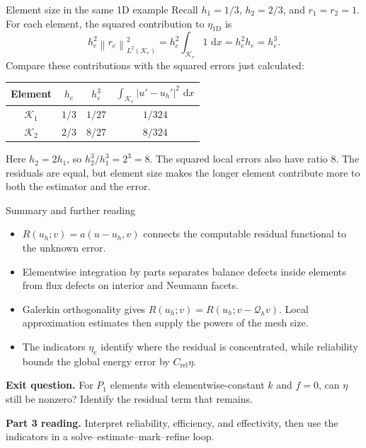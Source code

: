 \documentclass[11pt,aspectratio=169]{beamer}
\newcommand{\dd}{\,\mathrm{d}}
\newcommand{\Qh}{\mathcal Q_h}
\newcommand{\norm}[2][]{\left\lVert#2\right\rVert_{#1}}
\begin{document}
\begin{frame}{Element size in the same 1D example}
Recall $h_1=1/3$, $h_2=2/3$, and $r_1=r_2=1$. For each element, the
squared contribution to $\eta_{\mathrm{1D}}$ is
\[
 h_e^2\norm[L^2(\mathcal K_e)]{r_e}^2
 =h_e^2\int_{\mathcal K_e}1\,\dd x
 =h_e^2h_e=h_e^3.
\]
Compare these contributions with the squared errors just calculated:
\begin{center}
\begin{tabular}{cccc}
\toprule
Element & $h_e$ & $h_e^3$ & $\displaystyle\int_{\mathcal K_e}|u'-u_h'|^2\,\dd x$\\
\midrule
$\mathcal K_1$ & $1/3$ & $1/27$ & $1/324$\\[2pt]
$\mathcal K_2$ & $2/3$ & $8/27$ & $8/324$\\
\bottomrule
\end{tabular}
\end{center}
Here $h_2=2h_1$, so $h_2^3/h_1^3=2^3=8$. The squared local errors
also have ratio $8$. The residuals are equal, but element size makes the
longer element contribute more to both the estimator and the error.
\end{frame}

\begin{frame}{Summary and further reading}
\begin{itemize}
  \item $R(u_h;v)=a(u-u_h,v)$ connects the computable residual functional to
  the unknown error.
  \item Elementwise integration by parts separates balance defects inside
  elements from flux defects on interior and Neumann facets.
  \item Galerkin orthogonality gives $R(u_h;v)=R(u_h;v-\Qh v)$.
  Local approximation estimates then supply the powers of the mesh size.
  \item The indicators $\eta_e$ identify where the residual is concentrated,
  while reliability bounds the global energy error by $C_{\mathrm{rel}}\eta$.
\end{itemize}

\vspace{0.2cm}
\textbf{Exit question.} For $P_1$ elements with elementwise-constant $k$ and
$f=0$, can $\eta$ still be nonzero? Identify the residual term that remains.

\vspace{0.2cm}
\textbf{Part 3 reading.} Interpret reliability, efficiency, and effectivity,
then use the indicators in a solve--estimate--mark--refine loop.
\end{frame}
\end{document}
